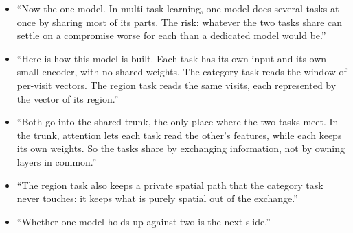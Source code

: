 \say
\begin{itemize}
  \item ``Now the one model. In multi-task learning, one model does several tasks at once by sharing
        most of its parts. The risk: whatever the two tasks share can settle on a compromise worse for
        each than a dedicated model would be.''
  \item ``Here is how this model is built. Each task has its own input and its own small encoder, with
        no shared weights. The category task reads the window of per-visit vectors. The region task
        reads the same visits, each represented by the vector of its region.''
  \item ``Both go into the shared trunk, the only place where the two tasks meet. In the trunk,
        attention lets each task read the other's features, while each keeps its own weights. So the
        tasks share by exchanging information, not by owning layers in common.''
  \item ``The region task also keeps a private spatial path that the category task never touches: it
        keeps what is purely spatial out of the exchange.''
  \item ``Whether one model holds up against two is the next slide.''
\end{itemize}

